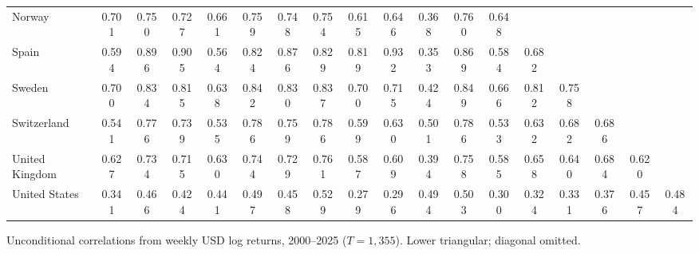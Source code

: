 \begin{table}[H]
\begin{adjustbox}{max width=1.5\textheight}
\begin{threeparttable}
\begin{tabular}{lSSSSSSSSSSSSSSSSS}
Norway & 0.701 & 0.750 & 0.727 & 0.661 & 0.759 & 0.748 & 0.754 & 0.615 & 0.646 & 0.368 & 0.760 & 0.648 & {} & {} & {} & {} & {} \\
Spain & 0.594 & 0.896 & 0.905 & 0.564 & 0.824 & 0.876 & 0.829 & 0.819 & 0.932 & 0.353 & 0.869 & 0.584 & 0.682 & {} & {} & {} & {} \\
Sweden & 0.700 & 0.834 & 0.815 & 0.638 & 0.842 & 0.830 & 0.837 & 0.700 & 0.715 & 0.424 & 0.849 & 0.666 & 0.812 & 0.758 & {} & {} & {} \\
Switzerland & 0.541 & 0.776 & 0.739 & 0.535 & 0.786 & 0.759 & 0.786 & 0.599 & 0.630 & 0.501 & 0.786 & 0.533 & 0.632 & 0.682 & 0.686 & {} & {} \\
United Kingdom & 0.627 & 0.734 & 0.715 & 0.630 & 0.744 & 0.729 & 0.761 & 0.587 & 0.609 & 0.394 & 0.758 & 0.585 & 0.658 & 0.640 & 0.684 & 0.620 & {} \\
United States & 0.341 & 0.466 & 0.424 & 0.441 & 0.497 & 0.458 & 0.529 & 0.279 & 0.296 & 0.494 & 0.503 & 0.300 & 0.324 & 0.331 & 0.376 & 0.457 & 0.484 \\
\bottomrule
\end{tabular}
\begin{tablenotes}[flushleft]
\small
\item Unconditional correlations from weekly USD log returns, 2000--2025 ($T=1{,}355$). Lower triangular; diagonal omitted.
\end{tablenotes}
\end{threeparttable}
\end{adjustbox}
\end{table}
